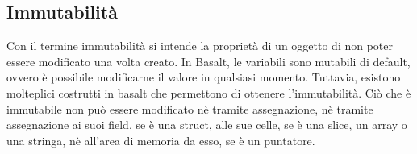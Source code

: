 \subsection{Immutabilità}
Con il termine immutabilità si intende la proprietà di un oggetto di non poter essere modificato una volta creato. In 
Basalt, le variabili sono mutabili di default, ovvero è possibile modificarne il valore in qualsiasi momento. Tuttavia, 
esistono molteplici costrutti in basalt che permettono di ottenere l'immutabilità. Ciò che è immutabile non può 
essere modificato nè tramite assegnazione, nè tramite assegnazione ai suoi field, se è una struct, alle sue celle, 
se è una slice, un array o una stringa, nè all'area di memoria da esso, se è un puntatore. 




